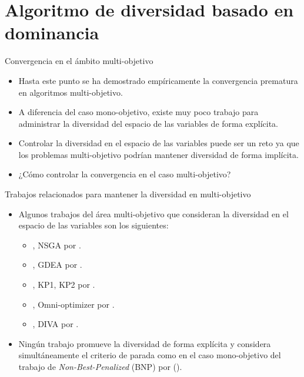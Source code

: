 \documentclass{beamer}
\begin{document}
\section{Algoritmo de diversidad basado en dominancia}

\begin{frame}{Convergencia en el ámbito multi-objetivo}
    \begin{itemize}
        \item Hasta este punto se ha demostrado empíricamente la convergencia prematura en algoritmos multi-objetivo.
	\item A diferencia del caso mono-objetivo, existe muy poco trabajo para administrar la diversidad del espacio de las variables de forma explícita.
	\item Controlar la diversidad en el espacio de las variables puede ser un reto ya que los problemas multi-objetivo podrían mantener diversidad de forma implícita.
	\item ¿Cómo controlar la convergencia en el caso multi-objetivo?
    \end{itemize}
\end{frame}

\begin{frame}{Trabajos relacionados para mantener la diversidad en multi-objetivo}
\begin{itemize}
\scriptsize
    \item Algunos trabajos del área multi-objetivo que consideran la diversidad en el espacio de las variables son los siguientes: \begin{itemize}
	\scriptsize
	\item \citeyear{Joel:NSGA}, NSGA por \citeauthor{Joel:NSGA}.
	\item \citeyear{toffolo2003genetic}, GDEA por \citeauthor{toffolo2003genetic}.
	\item \citeyear{chan2005evolutionary}, KP1, KP2 por \citeauthor{chan2005evolutionary}.
	\item \citeyear{deb2005omni}, Omni-optimizer por \citeauthor{deb2005omni}.
	\item \citeyear{ulrich2010integrating}, DIVA por \citeauthor{ulrich2010integrating}.
    \end{itemize}
   \item Ningún trabajo promueve la diversidad de forma explícita y considera simultáneamente el criterio de parada como en el caso mono-objetivo del trabajo de \textit{Non-Best-Penalized} (BNP) por \citeauthor{romero2018memetic} (\citeyear{romero2018memetic}).
\end{itemize}
\end{frame}
\end{document}
